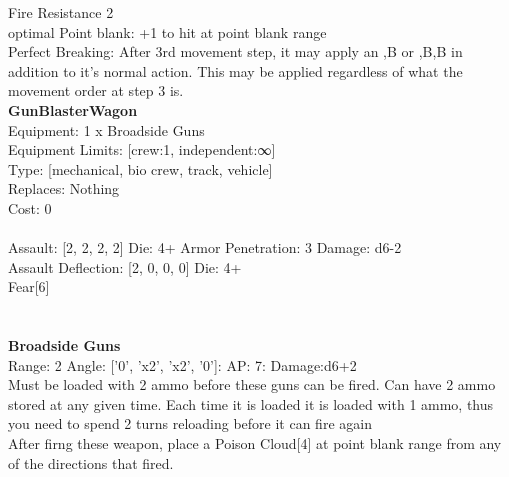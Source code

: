 \noindent Fire Resistance 2\\ 
optimal Point blank: +1 to hit at point blank range\\ 
Perfect Breaking: After 3rd movement step, it may apply an ,B or ,B,B in addition to it's normal action. This may be applied regardless of what the movement order at step 3 is.\\ 


{\bf GunBlasterWagon } \\
Equipment: 1 x Broadside Guns \\
Equipment Limits: [crew:1, independent:∞] \\
Type: [mechanical, bio crew, track, vehicle] \\
Replaces: Nothing \\
Cost: 0\\
\ \\
Assault: [2, 2, 2, 2] Die: 4+ Armor Penetration: 3 Damage: d6-2 \\
Assault Deflection: [2, 0, 0, 0] Die: 4+\\
\indent Fear[6]\\ 
 
\ \\

\ \\
{\bf Broadside Guns } \\



Range: 2  Angle: ['0', 'x2', 'x2', '0']: AP: 7: Damage:d6+2 \\
Must be loaded with 2 ammo before these guns can be fired. Can have 2 ammo stored at any given time. Each time it is loaded it is loaded with 1 ammo, thus you need to spend 2 turns reloading before it can fire again\\ 
After firng these weapon, place a Poison Cloud[4] at point blank range from any of the directions that fired.\\ 




 
\ \\



